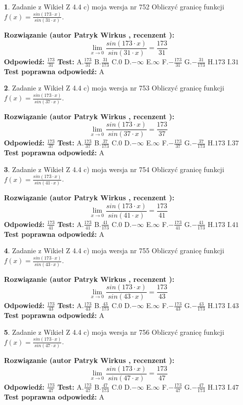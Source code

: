 \documentclass[12pt, a4paper]{article}
\theoremstyle{definition} %
\newtheorem{zad}{}
\newcommand{\zadStart}[1]{\begin{zad}#1\newline}
\newcommand{\zadStop}{\end{zad}}
\newcommand{\rozwStart}[2]{\noindent \textbf{Rozwiązanie (autor #1 , recenzent #2): }\newline}
\newcommand{\rozwStop}{\newline}
\newcommand{\odpStart}{\noindent \textbf{Odpowiedź:}\newline}
\newcommand{\odpStop}{\newline}
\newcommand{\testStart}{\noindent \textbf{Test:}\newline}
\newcommand{\testStop}{\newline}
\newcommand{\kluczStart}{\noindent \textbf{Test poprawna odpowiedź:}\newline}
\newcommand{\kluczStop}{\newline}
\begin{document}
\zadStart{Zadanie z Wikieł Z 4.4 c) moja wersja nr 752}
Obliczyć granicę funkcji $f(x)=\frac{sin(173\cdot x)}{sin(31\cdot x)}$.
\zadStop
\rozwStart{Patryk Wirkus}{}
$$\lim\limits_{x\to 0}\frac{sin(173\cdot x)}{sin(31\cdot x)}=
\frac{173}{31}$$
\rozwStop
\odpStart
$\frac{173}{31}$
\odpStop
\testStart
A.$\frac{173}{31}$
B.$\frac{31}{173}$
C.$0$
D.$-\infty$
E.$\infty$
F.$-\frac{173}{31}$
G.$-\frac{31}{173}$
H.$173$
I.$31$
\testStop
\kluczStart
A
\kluczStop



\zadStart{Zadanie z Wikieł Z 4.4 c) moja wersja nr 753}
Obliczyć granicę funkcji $f(x)=\frac{sin(173\cdot x)}{sin(37\cdot x)}$.
\zadStop
\rozwStart{Patryk Wirkus}{}
$$\lim\limits_{x\to 0}\frac{sin(173\cdot x)}{sin(37\cdot x)}=
\frac{173}{37}$$
\rozwStop
\odpStart
$\frac{173}{37}$
\odpStop
\testStart
A.$\frac{173}{37}$
B.$\frac{37}{173}$
C.$0$
D.$-\infty$
E.$\infty$
F.$-\frac{173}{37}$
G.$-\frac{37}{173}$
H.$173$
I.$37$
\testStop
\kluczStart
A
\kluczStop



\zadStart{Zadanie z Wikieł Z 4.4 c) moja wersja nr 754}
Obliczyć granicę funkcji $f(x)=\frac{sin(173\cdot x)}{sin(41\cdot x)}$.
\zadStop
\rozwStart{Patryk Wirkus}{}
$$\lim\limits_{x\to 0}\frac{sin(173\cdot x)}{sin(41\cdot x)}=
\frac{173}{41}$$
\rozwStop
\odpStart
$\frac{173}{41}$
\odpStop
\testStart
A.$\frac{173}{41}$
B.$\frac{41}{173}$
C.$0$
D.$-\infty$
E.$\infty$
F.$-\frac{173}{41}$
G.$-\frac{41}{173}$
H.$173$
I.$41$
\testStop
\kluczStart
A
\kluczStop



\zadStart{Zadanie z Wikieł Z 4.4 c) moja wersja nr 755}
Obliczyć granicę funkcji $f(x)=\frac{sin(173\cdot x)}{sin(43\cdot x)}$.
\zadStop
\rozwStart{Patryk Wirkus}{}
$$\lim\limits_{x\to 0}\frac{sin(173\cdot x)}{sin(43\cdot x)}=
\frac{173}{43}$$
\rozwStop
\odpStart
$\frac{173}{43}$
\odpStop
\testStart
A.$\frac{173}{43}$
B.$\frac{43}{173}$
C.$0$
D.$-\infty$
E.$\infty$
F.$-\frac{173}{43}$
G.$-\frac{43}{173}$
H.$173$
I.$43$
\testStop
\kluczStart
A
\kluczStop



\zadStart{Zadanie z Wikieł Z 4.4 c) moja wersja nr 756}
Obliczyć granicę funkcji $f(x)=\frac{sin(173\cdot x)}{sin(47\cdot x)}$.
\zadStop
\rozwStart{Patryk Wirkus}{}
$$\lim\limits_{x\to 0}\frac{sin(173\cdot x)}{sin(47\cdot x)}=
\frac{173}{47}$$
\rozwStop
\odpStart
$\frac{173}{47}$
\odpStop
\testStart
A.$\frac{173}{47}$
B.$\frac{47}{173}$
C.$0$
D.$-\infty$
E.$\infty$
F.$-\frac{173}{47}$
G.$-\frac{47}{173}$
H.$173$
I.$47$
\testStop
\kluczStart
A
\kluczStop
\end{document}

